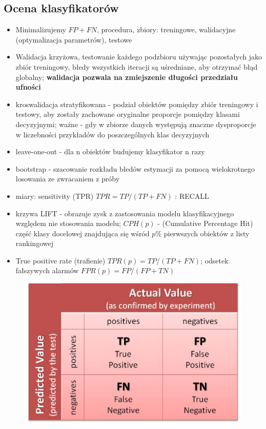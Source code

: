 \documentclass[10pt,a4paper]{article}
\begin{document}
\subsection{Ocena klasyfikatorów}
  \begin{itemize}
    \item Minimalizujemy $FP+FN$, procedura, zbiory: treningowe, walidacyjne (optymalizacja parametrów), testowe
    \item Walidacja krzyżowa, testowanie każdego podzbioru używając pozostałych jako zbiór treningowy, błedy wszystkich iteracji są uśredniane, aby otrzymać błąd globalny; \textbf{walidacja pozwala na zmiejszenie długości przedziału ufności}
    \item kroswalidacja stratyfikowana - podział obiektów pomiędzy zbiór treningowy i testowy, aby zostały zachowane oryginalne proporcje pomiędzy klasami decyzyjnymi; ważne - gdy w zbiorze danych występują znaczne dysproporcje w liczebności przykładów do poszczególnych klas decyzyjnych
    \item leave-one-out - dla n obiektów budujemy klasyfikator n razy
    \item bootstrap - szacowanie rozkładu błedów estymacji za pomocą wielokrotnego losowania ze zwracaniem z próby
    \item miary: sensitivity (TPR) $TPR = TP/(TP+FN)$ : RECALL
    \item krzywa LIFT - obrazuje zysk z zastosowania modelu klasyfikacyjnego względem nie stosowania modelu; $CPH(p)$ - (Cumulative Percentage Hit) część klasy docelowej znajdująca się wśród $p\%$ pierwszych obiektów z listy rankingowej
    \item True positive rate (trafienie) $TPR(p) = TP / (TP + FN)$; odsetek fałszywych alarmów $FPR(p) = FP / (FP+TN)$
  \end{itemize}
\begin{figure}[H]
  \centering
    \includegraphics[scale=0.50]{images/macierz.png}
\end{figure}
\end{document}
